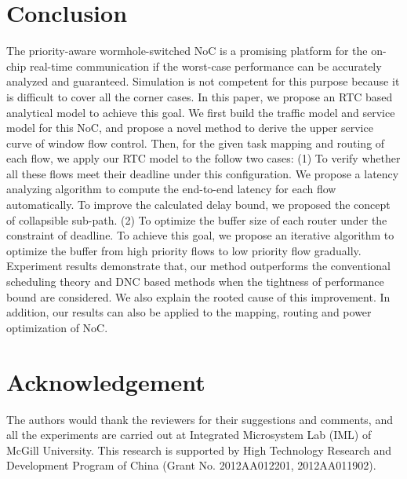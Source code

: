 \documentclass[10pt,journal]{IEEEtran}
\begin{document}
\section{Conclusion}\label{conclusion}
The priority-aware wormhole-switched NoC is a promising platform for the on-chip real-time communication if the worst-case performance can be accurately analyzed and guaranteed. Simulation is not competent for this purpose because it is difficult to cover all the corner cases. In this paper, we propose an RTC based analytical model to achieve this goal. We first build the traffic model and service model for this NoC, and propose a novel method to derive the upper service curve of window flow control. Then, for the given task mapping and routing of each flow, we apply our RTC model to the follow two cases: (1) To verify whether all these flows meet their deadline under this configuration. We propose a latency analyzing algorithm to compute the end-to-end latency for each flow automatically. To improve the calculated delay bound, we proposed the concept of collapsible sub-path. (2) To optimize the buffer size of each router under the constraint of deadline. To achieve this goal, we propose an iterative algorithm to optimize the buffer from high priority flows to low priority flow gradually. Experiment results demonstrate that, our method outperforms the conventional scheduling theory and DNC based methods when the tightness of performance bound are considered. We also explain the rooted cause of this improvement. In addition, our results can also be applied to the mapping, routing and power optimization of NoC.

\section*{Acknowledgement}
The authors would thank the reviewers for their suggestions and comments, and all the experiments are carried out at Integrated Microsystem Lab (IML) of McGill University. This research is supported by High Technology Research and Development Program of China (Grant No. 2012AA012201, 2012AA011902).



\end{document}
